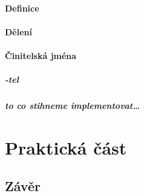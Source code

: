 \hypertarget{definice}{%
\subsection{Definice}\label{definice}}

\hypertarget{dux11blenuxed}{%
\subsection{Dělení}\label{dux11blenuxed}}

\hypertarget{ux10dinitelskuxe1-jmuxe9na}{%
\subsection{Činitelská jména}\label{ux10dinitelskuxe1-jmuxe9na}}

\hypertarget{tel}{%
\subsubsection{-tel}\label{tel}}

\hypertarget{to-co-stihneme-implementovat}{%
\subsubsection{to co stihneme
implementovat\ldots{}}\label{to-co-stihneme-implementovat}}

\part{Praktická část}

\hypertarget{zuxe1vux11br}{%
\chapter*{Závěr}\label{zaver}
}
